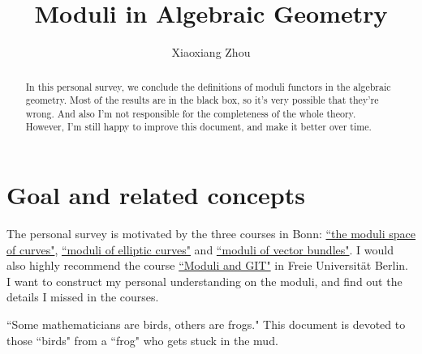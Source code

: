\documentclass[reqno,11pt]{amsart}
\numberwithin{equation}{section}
\theoremstyle{plain}
\theoremstyle{plain}
\numberwithin{equation}{section}
\theoremstyle{remark}
\begin{document}
\date{}

\title
{Moduli in Algebraic Geometry}


\author{Xiaoxiang Zhou}
\address{School of Mathematical Sciences\\
University of Bonn\\
Bonn, 53115\\ Germany\\} 





\begin{abstract}
In this personal survey, we conclude the definitions of moduli functors in the algebraic geometry. Most of the results are in the black box, so it's very possible that they're wrong. And also I'm not responsible for the completeness of the whole theory. However, I'm still happy to improve this document, and make it better over time.
\end{abstract}

\setcounter{tocdepth}{1}
\maketitle
\tableofcontents
\section{Goal and related concepts}
The personal survey is motivated by the three courses in Bonn: \href{https://johannesschmitt.gitlab.io/moduli_of_curves}{``the moduli space of curves"}, \href{https://www.math.uni-bonn.de/people/mihatsch/21u22\%20WS/moduli/}{``moduli of elliptic curves"} and \href{https://www.math.uni-bonn.de/people/ydutta/v5a4}{``moduli of vector bundles"}. I would also highly recommend the course \href{https://userpage.fu-berlin.de/hoskins/moduli_and_GIT.html}{``Moduli and GIT"} in Freie Universität Berlin. I want to construct my personal understanding on the moduli, and find out the details I missed in the courses. 

``Some mathematicians are birds, others
are frogs." This document is devoted to those ``birds" from a ``frog" who gets stuck in the mud. 
\end{document}
